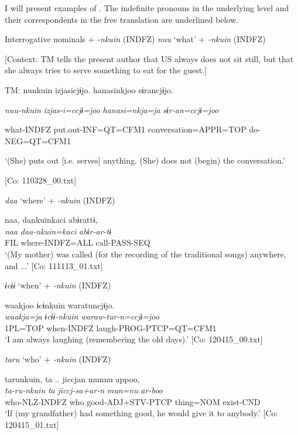   I will present examples of . The indefinite pronouns in the underlying level and their correspondents in the free translation are underlined below.

\ea \label{ex:7:22}  Interrogative nominals + \textit{{}-nkuin} (INDFZ)
\ea \label{ex:7:22a}\textit{nuu} ‘what’ + \textit{{}-nkuin} (INDFZ)

    [Context: TM tells the present author that US always does not sit still, but that she always tries to serve something to eat for the guest.]

    TM:  nunkuin  izjasicjɨjo.  hanasinkjoo  sɨrancjɨjo.

      \textit{nuu-nkuin}  \textit{izjas-i=ccjɨ=joo}  \textit{hanasi=nkja=ja}  \textit{sɨr-an=ccjɨ=joo}
                                                                             
      what-INDFZ  put.out-INF=QT=CFM1  conversation=APPR=TOP                  do-NEG=QT=CFM1

      ‘(She) puts out [i.e. serves] anything. (She) does not (begin) the conversation.’

      [Co: 110328\_00.txt]

\ex \label{ex:7:22b}\textit{daa} ‘where’ + \textit{{}-nkuin} (INDFZ)

\glll  naa,  dankuinkaci  abɨrattɨ,\\
\textit{naa}  \textit{daa-nkuin=kaci}  \textit{abɨr-ar-tɨ}\\
FIL  where-INDFZ=ALL  call-PASS-SEQ\\
\glt ‘(My mother) was called (for the recording of the traditional songs) anywhere, and ...’ [Co: 111113\_01.txt]

\ex \label{ex:7:22c}\textit{ɨcɨɨ} ‘when’ + \textit{{}-nkuin} (INDFZ)

\glll  waakjoo  ɨcɨnkuin  waratuncjɨjo.\\
\textit{waakja=ja}  \textit{ɨcɨɨ-nkuin}  \textit{waraw-tur-n=ccjɨ=joo}\\
1PL=TOP  when-INDFZ  laugh-PROG-PTCP=QT=CFM1\\
\glt ‘I am always laughing (remembering the old days).’ [Co: 120415\_00.txt]

\ex \label{ex:7:22d}\textit{taru} ‘who’ + \textit{{}-nkuin} (INDFZ)

\glll  tarunkuin,  ta ..  jiccjan  munnu  appoo,\\
\textit{ta-ru-nkuin}  \textit{ta}  \textit{jiccj-sa+ar-n}  \textit{mun=nu}  \textit{ar-boo}\\
who-NLZ-INDFZ  who  good-ADJ+STV-PTCP  thing=NOM  exist-CND\\
\glt ‘If (my grandfather) had something good, he would give it to anybody.’ [Co: 120415\_01.txt]

